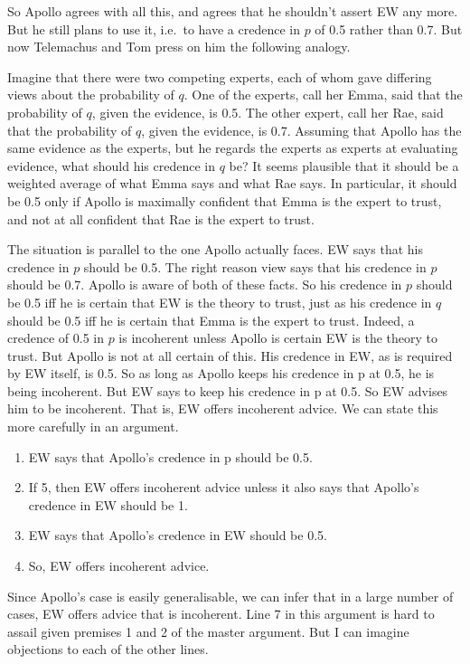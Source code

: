 \documentclass[
  11pt,
  letterpaper,
  DIV=11,
  numbers=noendperiod,
  oneside]{scrartcl}
\providecommand{\tightlist}{%
  \setlength{\itemsep}{0pt}\setlength{\parskip}{0pt}}\usepackage{longtable,booktabs,array}
\begin{document}
So Apollo agrees with all this, and agrees that he shouldn't assert EW
any more. But he still plans to use it, i.e.~to have a credence in \(p\)
of 0.5 rather than 0.7. But now Telemachus and Tom press on him the
following analogy.

Imagine that there were two competing experts, each of whom gave
differing views about the probability of \(q\). One of the experts, call
her Emma, said that the probability of \(q\), given the evidence, is
0.5. The other expert, call her Rae, said that the probability of \(q\),
given the evidence, is 0.7. Assuming that Apollo has the same evidence
as the experts, but he regards the experts as experts at evaluating
evidence, what should his credence in \(q\) be? It seems plausible that
it should be a weighted average of what Emma says and what Rae says. In
particular, it should be 0.5 only if Apollo is maximally confident that
Emma is the expert to trust, and not at all confident that Rae is the
expert to trust.

The situation is parallel to the one Apollo actually faces. EW says that
his credence in \(p\) should be 0.5. The right reason view says that his
credence in \(p\) should be 0.7. Apollo is aware of both of these facts.
So his credence in \(p\) should be 0.5 iff he is certain that EW is the
theory to trust, just as his credence in \(q\) should be 0.5 iff he is
certain that Emma is the expert to trust. Indeed, a credence of 0.5 in
\(p\) is incoherent unless Apollo is certain EW is the theory to trust.
But Apollo is not at all certain of this. His credence in EW, as is
required by EW itself, is 0.5. So as long as Apollo keeps his credence
in p at 0.5, he is being incoherent. But EW says to keep his credence in
p at 0.5. So EW advises him to be incoherent. That is, EW offers
incoherent advice. We can state this more carefully in an argument.

\begin{enumerate}
\def\labelenumi{\arabic{enumi}.}
\setcounter{enumi}{4}
\tightlist
\item
  EW says that Apollo's credence in p should be 0.5.
\item
  If 5, then EW offers incoherent advice unless it also says that
  Apollo's credence in EW should be 1.
\item
  EW says that Apollo's credence in EW should be 0.5.
\item
  So, EW offers incoherent advice.
\end{enumerate}

Since Apollo's case is easily generalisable, we can infer that in a
large number of cases, EW offers advice that is incoherent. Line 7 in
this argument is hard to assail given premises 1 and 2 of the master
argument. But I can imagine objections to each of the other lines.
\end{document}
